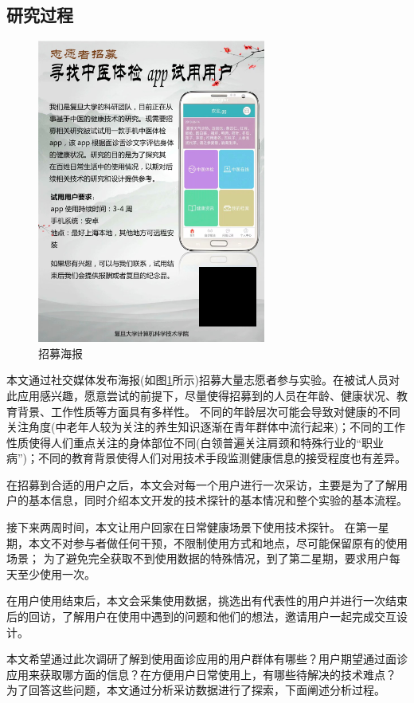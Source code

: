 \subsection{研究过程}
\begin{figure}[ht]
    \centering
    \includegraphics[height=10cm]{images/poster.png}
    \caption{招募海报}
    \label{fig:poster}
\end{figure}

本文通过社交媒体发布海报(如图\ref{fig:poster}所示)招募大量志愿者参与实验。在被试人员对此应用感兴趣，愿意尝试的前提下，尽量使得招募到的人员在年龄、健康状况、教育背景、工作性质等方面具有多样性。
不同的年龄层次可能会导致对健康的不同关注角度(中老年人较为关注的养生知识逐渐在青年群体中流行起来)；不同的工作性质使得人们重点关注的身体部位不同(白领普遍关注肩颈和特殊行业的“职业病”)；不同的教育背景使得人们对用技术手段监测健康信息的接受程度也有差异。

在招募到合适的用户之后，本文会对每一个用户进行一次采访，主要是为了了解用户的基本信息，同时介绍本文开发的技术探针的基本情况和整个实验的基本流程。

接下来两周时间，本文让用户回家在日常健康场景下使用技术探针。
在第一星期，本文不对参与者做任何干预，不限制使用方式和地点，尽可能保留原有的使用场景；
为了避免完全获取不到使用数据的特殊情况，到了第二星期，要求用户每天至少使用一次。

在用户使用结束后，本文会采集使用数据，挑选出有代表性的用户并进行一次结束后的回访，了解用户在使用中遇到的问题和他们的想法，邀请用户一起完成交互设计。


本文希望通过此次调研了解到使用面诊应用的用户群体有哪些？用户期望通过面诊应用来获取哪方面的信息？在方便用户日常使用上，有哪些待解决的技术难点？
为了回答这些问题，本文通过分析采访数据进行了探索，下面阐述分析过程。

